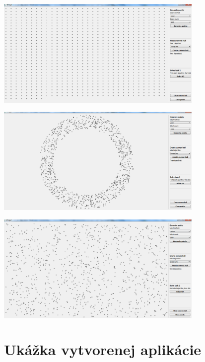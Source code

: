 \documentclass[12pt]{article}
\begin{document}
\begin{center}
   \includegraphics[width=10cm]{./img/points_generate_grid_1000.png}
\end{center}

\begin{center}
   \includegraphics[width=10cm]{./img/points_generate_circle_1000.png}
\end{center}

\begin{center}
   \includegraphics[width=10cm]{./img/points_generate_random_1000.png}
\end{center}

\clearpage 
\section{Ukážka vytvorenej aplikácie}
\end{document}

